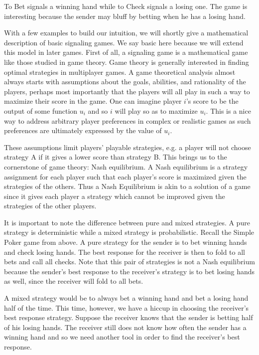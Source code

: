 \documentclass{article}
\begin{document}
To Bet signals a winning hand while to Check signals a losing one. The game is interesting because the sender may bluff by betting when he has a losing hand. 

With a few examples to build our intuition, we will shortly give a mathematical description of basic signaling games. We say basic here because we will extend this model in later games. First of all, a signaling game is a mathematical game like those studied in game theory. Game theory is generally interested in finding optimal strategies in multiplayer games. A game theoretical analysis almost always starts with assumptions about the goals, abilities, and rationality of the players, perhaps most importantly that the players will all play in such a way to maximize their score in the game. One can imagine player $i$'s score to be the output of some function $u_i$ and so $i$ will play so as to maximize $u_i$. This is a nice way to address arbitrary player preferences in complex or realistic games as such preferences are ultimately expressed by the value of $u_i$. 

These assumptions limit players' playable strategies, e.g. a player will not choose strategy A if it gives a lower score than strategy B. This brings us to the cornerstone of game theory: Nash equilibrium. A Nash equilibrium is a strategy assignment for each player such that each player's score is maximized given the strategies of the others. Thus a Nash Equilibrium is akin to a solution of a game since it gives each player a strategy which cannot be improved given the strategies of the other players.

It is important to note the difference between pure and mixed strategies. A pure strategy is deterministic while a mixed strategy is probabilistic. Recall the Simple Poker game from above. A pure strategy for the sender is to bet winning hands and check losing hands. The best response for the receiver is then to fold to all bets and call all checks. Note that this pair of strategies is not a Nash equilibrium because the sender's best response to the receiver's strategy is to bet losing hands as well, since the receiver will fold to all bets. 

A mixed strategy would be to always bet a winning hand and bet a losing hand half of the time. This time, however, we have a hiccup in choosing the receiver's best response strategy. Suppose the receiver knows that the sender is betting half of his losing hands. The receiver still does not know how often the sender has a winning hand and so we need another tool in order to find the receiver's best response.
\end{document}
